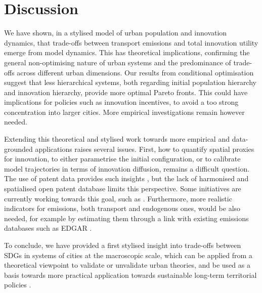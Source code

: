 \documentclass[final,5p,times,twocolumn,authoryear]{elsarticle}
\begin{document}
\section{Discussion}

We have shown, in a stylised model of urban population and innovation dynamics, that trade-offs between transport emissions and total innovation utility emerge from model dynamics. This has theoretical implications, confirming the general non-optimising nature of urban systems and the predominance of trade-offs across different urban dimensions. Our results from conditional optimisation suggest that less hierarchical systems, both regarding initial population hierarchy and innovation hierarchy, provide more optimal Pareto fronts. This could have implications for policies such as innovation incentives, to avoid a too strong concentration into larger cities. More empirical investigations remain however needed.

Extending this theoretical and stylised work towards more empirical and data-grounded applications raises several issues. First, how to quantify spatial proxies for innovation, to either parametrise the initial configuration, or to calibrate model trajectories in terms of innovation diffusion, remains a difficult question. The use of patent data provides such insights \cite{griliches200713}, but the lack of harmonised and spatialised open patent database limits this perspective. Some initiatives are currently working towards this goal, such as \cite{bergeaud2021patentcity}. Furthermore, more realistic indicators for emissions, both transport and endogenous ones, would be also needed, for example by estimating them through a link with existing emissions databases such as EDGAR \cite{olivier1994emission}.

To conclude, we have provided a first stylised insight into trade-offs between SDGs in systems of cities at the macroscopic scale, which can be applied from a theoretical viewpoint to validate or unvalidate urban theories, and be used as a basis towards more practical application towards sustainable long-term territorial policies \cite{rozenblat2018conclusion}.




 





\end{document}
